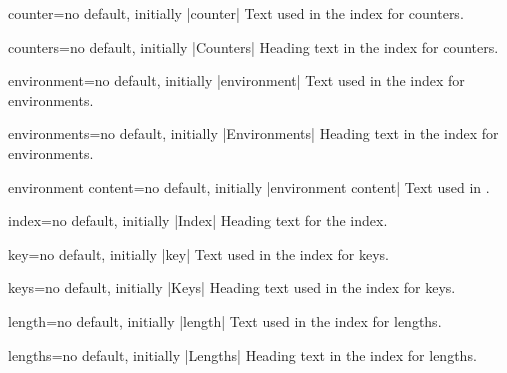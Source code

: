 \begin{langTcbKey}[][doc new={2015-01-08}]{counter}{=}{no default, initially |counter|}
  Text used in the index for counters.
\end{langTcbKey}

\begin{langTcbKey}[][doc new={2015-01-08}]{counters}{=}{no default, initially |Counters|}
  Heading text in the index for counters.
\end{langTcbKey}

\begin{langTcbKey}{environment}{=}{no default, initially |environment|}
  Text used in the index for environments.
\end{langTcbKey}

\begin{langTcbKey}{environments}{=}{no default, initially |Environments|}
  Heading text in the index for environments.
\end{langTcbKey}

\begin{langTcbKey}{environment content}{=}{no default, initially |environment content|}
  Text used in .
\end{langTcbKey}

\begin{langTcbKey}{index}{=}{no default, initially |Index|}
  Heading text for the index.
\end{langTcbKey}

\begin{langTcbKey}{key}{=}{no default, initially |key|}
  Text used in the index for keys.
\end{langTcbKey}

\begin{langTcbKey}{keys}{=}{no default, initially |Keys|}
  Heading text used in the index for keys.
\end{langTcbKey}

\begin{langTcbKey}[][doc new={2015-01-08}]{length}{=}{no default, initially |length|}
  Text used in the index for lengths.
\end{langTcbKey}

\begin{langTcbKey}[][doc new={2015-01-08}]{lengths}{=}{no default, initially |Lengths|}
  Heading text in the index for lengths.
\end{langTcbKey}


